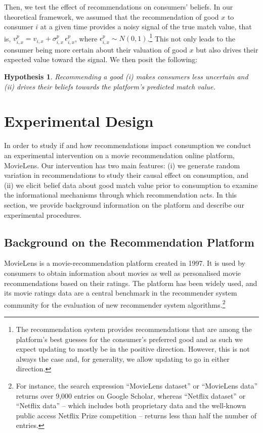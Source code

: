 \documentclass[12pt]{article}
\theoremstyle{newtheorem}
\newtheorem{hypothesis}{Hypothesis}
\begin{document}
Then, we test the effect of recommendations on consumers' beliefs.
In our theoretical framework, we assumed that the recommendation of good $x$ to consumer $i$ at a given time provides a noisy signal of the true match value, that is, $v_{i,x}^p=v_{i,x}+\sigma_{i,x}^p\,\epsilon_{i,x}^p$, where $\epsilon_{i,x}^p\sim N(0,1)$.\footnote{
    The recommendation system provides recommendations that are among the platform's best guesses for the consumer's preferred good and as such we expect updating to mostly be in the positive direction. 
    However, this is not always the case and, for generality, we allow updating to go in either direction.
} 
This not only leads to the consumer being more certain about their valuation of good $x$ but also drives their expected value toward the signal. 
We then posit the following:
\begin{hypothesis}
    \label{hypothesis:beliefs-on-rec}
    Recommending a good (i) makes consumers less uncertain and (ii) drives their beliefs towards the platform's predicted match value.
\end{hypothesis}



\section{Experimental Design}
\label{section:design}
In order to study if and how recommendations impact consumption we conduct an experimental intervention on a movie recommendation online platform, MovieLens.
Our intervention has two main features: 
(i) we generate random variation in recommendations to study their causal effect on consumption, and 
(ii) we elicit belief data about good match value prior to consumption to examine the informational mechanisms through which recommendation acts.
In this section, we provide background information on the platform and describe our experimental procedures.


\subsection{Background on the Recommendation Platform}
\label{section:design:background-on-platform}
MovieLens is a movie-recommendation platform created in 1997. 
It is used by consumers to obtain information about movies as well as personalised movie recommendations based on their ratings. 
The platform has been widely used, and its movie ratings data are a central benchmark in the recommender system community for the evaluation of new recommender system algorithms.\footnote{
    For instance, the search expression ``MovieLens dataset'' or ``MovieLens data'' returns over 9,000 entries on Google Scholar, whereas ``Netflix dataset'' or ``Netflix data'' -- which includes both proprietary data and the well-known public access Netflix Prize competition \citep{BennetLanning2007} -- returns less than half the number of entries.
}
\end{document}
